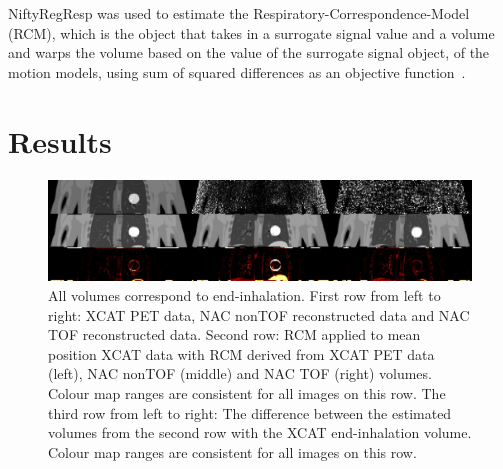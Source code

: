 \documentclass{IEEEtran}
\begin{document}
NiftyRegResp was used to estimate the Respiratory-Correspondence-Model (RCM), which is the object that takes in a surrogate signal value and a volume and warps the volume based on the value of the surrogate signal object, of the motion models, using sum of squared differences as an objective function~\cite{McClelland2017}.

\vspace{-0.2cm}

\section{Results}
\begin{figure}
    \vspace{-0.2cm}
    
    \centering
    \includegraphics[width=0.9\linewidth]{figures/output.png}
    \caption{All volumes correspond to end-inhalation. First row from left to right: XCAT PET data, NAC nonTOF reconstructed data and NAC TOF reconstructed data. Second row: RCM applied to mean position XCAT data with RCM derived from XCAT PET data (left), NAC nonTOF (middle) and NAC TOF (right) volumes. Colour map ranges are consistent for all images on this row. The third row from left to right: The difference between the estimated volumes from the second row with the XCAT end-inhalation volume. Colour map ranges are consistent for all images on this row.}
    \label{fig:output}
    
    \vspace{-0.2cm}
\end{figure}
\end{document}
